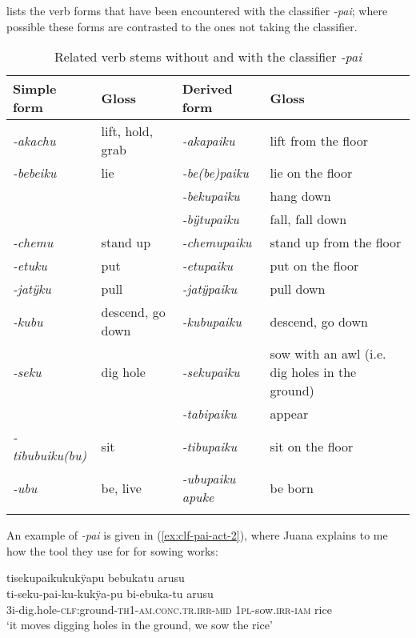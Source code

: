  lists the verb forms that have been encountered with the classifier \textit{-pai}; where possible these forms are contrasted to the ones not taking the classifier.

\begin{table}
\caption{Related verb stems without and with the classifier \textit{-pai}}

\begin{tabularx}{\textwidth}{lllQ}
\lsptoprule
Simple form & Gloss & Derived form & Gloss \\
\midrule
\textit{-akachu} & lift, hold, grab & \textit{-akapaiku} & lift from the floor\\
\textit{-bebeiku} & lie & \textit{-be(be)paiku} & lie on the floor\\
 &  & \textit{-bekupaiku} & hang down\\
 &  & \textit{-bÿtupaiku} & fall, fall down\\
\textit{-chemu} & stand up & \textit{-chemupaiku} & stand up from the floor\\
\textit{-etuku} & put & \textit{-etupaiku} & put on the floor\\
\textit{-jatÿku} & pull & \textit{-jatÿpaiku} & pull down\\
\textit{-kubu} & descend, go down & \textit{-kubupaiku} & descend, go down\\
\textit{-seku} & dig hole & \textit{-sekupaiku} & sow with an awl (i.e. dig holes in the ground)\\
& & \textit{-tabipaiku} & appear\\
\textit{-tibubuiku(bu)} & sit & \textit{-tibupaiku} & sit on the floor\\
\textit{-ubu} & be, live & \textit{-ubupaiku apuke} & be born\\
\lspbottomrule
\end{tabularx}

\label{table:DIR-pai-deriv}
\end{table}


An example of \textit{-pai} is given in (\ref{ex:clf-pai-act-2}), where Juana explains to me how the tool they use for for sowing works:

\ea\label{ex:clf-pai-act-2}
\begingl
\glpreamble tisekupaikukukÿapu bebukatu arusu\\
\gla ti-seku-pai-ku-kukÿa-pu bi-ebuka-tu arusu\\
\glb 3i-dig.hole-\textsc{clf:}ground-\textsc{th}1-\textsc{am.conc.tr.irr}-\textsc{mid} 1\textsc{pl}-sow.\textsc{irr}-\textsc{iam} rice\\
\glft ‘it moves digging holes in the ground, we sow the rice’
\endgl
\trailingcitation{[jxx-p120515l-2.042]}
\xe

